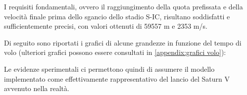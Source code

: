 I requisiti fondamentali, ovvero il raggiungimento della quota prefissata e della velocità finale prima dello sgancio dello stadio S-IC, risultano soddisfatti e sufficientemente precisi, con valori ottenuti di 59557 m e 2353 m/s.

Di seguito sono riportati i grafici di alcune grandezze in funzione del tempo di volo (ulteriori grafici possono essere consultati in \autoref{appendix:grafici volo}):



Le evidenze sperimentali ci permettono quindi di assumere il modello implementato come effettivamente rappresentativo del lancio del Saturn V avvenuto nella realtà.